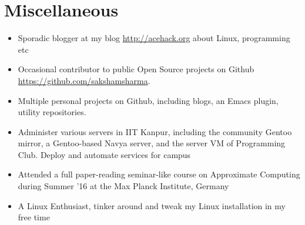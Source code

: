 \documentclass[11pt,a4paper]{moderncv}
\begin{document}
\section*{Miscellaneous}
\begin{itemize}
  \item Sporadic blogger at my blog \url{http://acehack.org} about Linux, programming etc
  \item Occasional contributor to public Open Source projects on Github
    \url{https://github.com/sakshamsharma}.
  \item Multiple personal projects on Github, including blogs, an
    Emacs plugin, utility repositories.
  \item	Administer various servers in IIT Kanpur, including the
    community Gentoo mirror, a Gentoo-based Navya server, and the
    server VM of Programming Club. Deploy and automate services for
    campus
  \item Attended a full paper-reading seminar-like course on
    Approximate Computing during Summer ’16 at the Max Planck
    Institute, Germany
  \item A Linux Enthusiast, tinker around and tweak my Linux installation in my free time
\end{itemize}
\end{document}
